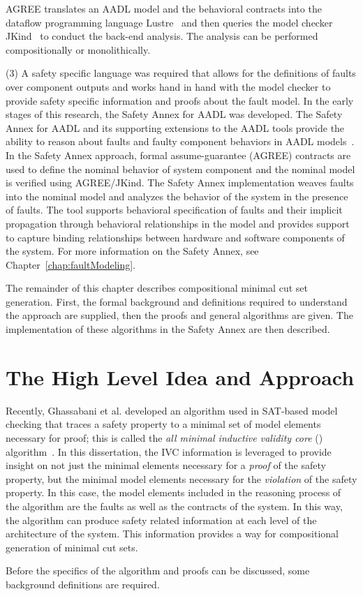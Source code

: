 AGREE translates an AADL model and the behavioral contracts into the dataflow programming language Lustre~\cite{Halbwachs91:IEEE} and then queries the model checker JKind~\cite{2017arXiv171201222G} to conduct the back-end analysis. The analysis can be performed compositionally or monolithically.

(3) A safety specific language was required that allows for the definitions of faults over component outputs and works hand in hand with the model checker to provide safety specific information and proofs about the fault model. In the early stages of this research, the Safety Annex for AADL was developed. The Safety Annex for AADL and its supporting extensions to the AADL tools provide the ability to reason about faults and faulty component behaviors in AADL models~\cite{Stewart17:IMBSA,stewart2020safety, nasaFinalReport}. In the Safety Annex approach, formal assume-guarantee (AGREE) contracts are used to define the nominal behavior of system component and the nominal model is verified using AGREE/JKind. The Safety Annex implementation weaves faults into the nominal model and analyzes the behavior of the system in the presence of faults. The tool supports behavioral specification of faults and their implicit propagation through behavioral relationships in the model and provides support to capture binding relationships between hardware and software components of the system. For more information on the Safety Annex, see Chapter~\ref{chap:faultModeling}.

The remainder of this chapter describes compositional minimal cut set generation. First, the formal background and definitions required to understand the approach are supplied, then the proofs and general algorithms are given. The implementation of these algorithms in the Safety Annex are then described.

\section{The High Level Idea and Approach}
Recently, Ghassabani et al. developed an algorithm used in SAT-based model checking that traces a safety property to a minimal set of model elements necessary for proof; this is called the \textit{all minimal inductive validity core} (\aivcalg) algorithm~\cite{GhassabaniGW16,Ghassabani2017EfficientGO,bendik2018online}. In this dissertation, the IVC information is leveraged to provide insight on not just the minimal elements necessary for a \textit{proof} of the safety property, but the minimal model elements necessary for the \textit{violation} of the safety property. In this case, the model elements included in the reasoning process of the \aivcalg algorithm are the faults as well as the contracts of the system. In this way, the \aivcalg algorithm can produce safety related information at each level of the architecture of the system. This information provides a way for compositional generation of minimal cut sets.

Before the specifics of the algorithm and proofs can be discussed, some background definitions are required.







